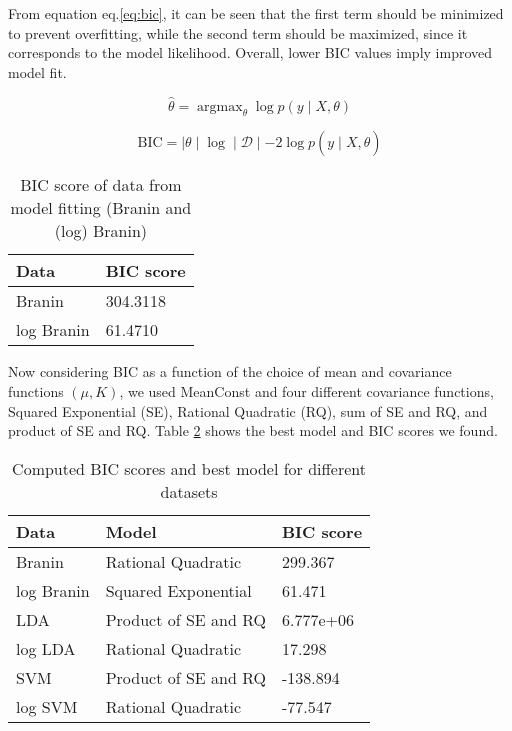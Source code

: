 \documentclass[11pt]{article}
\newcommand{\mc}[1]{\mathcal{#1}}
\newcommand{\data}{\mc{D}}
\DeclareMathOperator*{\argmax}{\arg\max}
\numberwithin{equation}{section}
\begin{document}
From equation eq.\ref{eq:bic}, it can be seen that the first term should be minimized to prevent overfitting, while the second term should be maximized, since it corresponds to the model likelihood. Overall, lower BIC values imply improved model fit. 

\begin{equation}
  \hat \theta = \argmax_\theta \log p(y \mid X, \theta)
  \label{eq:hyperparameter-estimate}
\end{equation}

\begin{equation}
  \text{BIC} = \mid \theta \mid \log \mid \data \mid - 2 \log p(y \mid X, \hat \theta)
  \label{eq:bic}
\end{equation}

\begin{table}[H]
  \centering
  \begin{tabular}{| l | l |}
    \hline
    Data       & BIC score \\
    \hline
    Branin     & 304.3118  \\
    \hline
    log Branin & 61.4710   \\
    \hline
  \end{tabular}
  \caption{BIC score of data from model fitting (Branin and (log) Branin)}
  \label{tab:basic_bic}
\end{table}

Now considering BIC as a function of the choice of mean and covariance functions $(\mu, K)$, we used MeanConst and four different covariance functions, Squared Exponential (SE), Rational Quadratic (RQ), sum of SE and RQ, and product of SE and RQ. Table \ref{tab:bic_score} shows the best model and BIC scores we found.

\begin{table}[H]
  \centering
  \begin{tabular}{| l | l | l |}
    \hline
    Data       & Model                & BIC score \\
    \hline
    Branin     & Rational Quadratic   & 299.367   \\
    \hline
    log Branin & Squared Exponential  & 61.471    \\
    \hline
    LDA        & Product of SE and RQ & 6.777e+06 \\
    \hline
    log LDA    & Rational Quadratic   & 17.298    \\
    \hline
    SVM        & Product of SE and RQ & -138.894  \\
    \hline
    log SVM    & Rational Quadratic   & -77.547   \\
    \hline
  \end{tabular}
  \caption{Computed BIC scores and best model for different datasets}
  \label{tab:bic_score}
\end{table}
\end{document}
